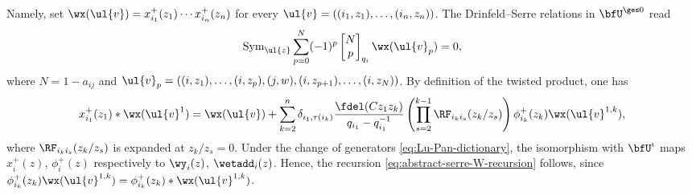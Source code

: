 \documentclass[reqno]{amsart}
\numberwithin{equation}{section}
\begin{document}
Namely, set
$\wx(\ul{v})=x_{i_1}^+(z_1)\cdots x_{i_n}^+(z_n)$ for every $\ul{v}=((i_1,z_1),\ldots,(i_n,z_n))$. The Drinfeld--Serre relations in $\bfU^{\ges0}$ read
\begin{align}
\operatorname{Sym}_{\ul{z}}
\sum_{p=0}^{N}
(-1)^p
\begin{bmatrix}N\\ p\end{bmatrix}_{q_i}
\wx(\ul{v}_p)
=0,
\end{align}
where $N=1-a_{ij}$ and $\ul{v}_p=((i,z_1),\ldots,(i,z_p),(j,w),
(i,z_{p+1}),\ldots,(i,z_N))$. By definition of the twisted product, one has
\begin{equation}
\begin{aligned}
	x_{i_1}^+(z_1)*\wx(\ul{v}^1)
	=\wx(\ul{v})
	+\sum_{k=2}^n \delta_{i_1,\tau(i_k)}
	\frac{\fdel(Cz_1z_k)}
	{q_{i_1}-q_{i_1}^{-1}}
	\left(\prod_{s=2}^{k-1}\RF_{i_k i_s}(z_k/z_s)\right)
	\phi^+_{i_k}(z_k)\wx(\ul{v}^{1,k}),
\end{aligned}
\end{equation}
where $\RF_{i_k i_s}(z_k/z_s)$ is expanded at $z_k/z_s=0$.
Under the change of generators \eqref{eq:Lu-Pan-dictionary}, 
the isomorphism with $\bfU^\imath$ maps $x_i^+(z)$, $\phi^+_i(z)$ respectively to 
$\wy_i(z)$, $\wetadd_i(z)$.
Hence, the recursion \eqref{eq:abstract-serre-W-recursion} follows, since $\phi^+_{i_k}(z_k)\wx(\ul{v}^{1,k})=\phi^+_{i_k}(z_k)*\wx(\ul{v}^{1,k})$.
\end{document}
